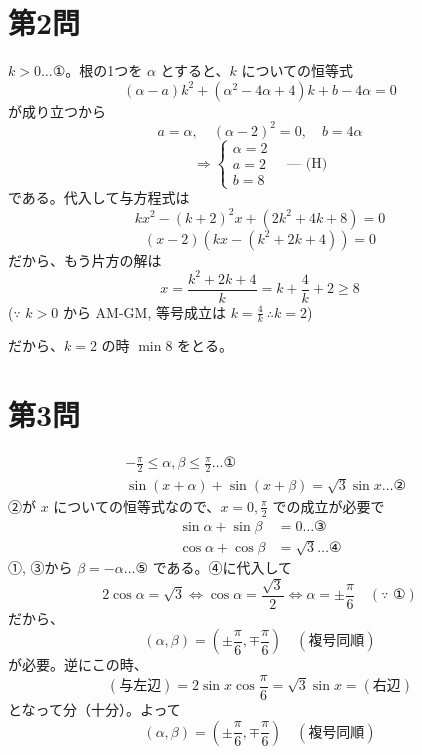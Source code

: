 \documentclass[../main.tex]{subfiles}
\begin{document}
\section*{第2問}

\noindent
[\textbf{解}] $k > 0 \dots \text{①}$。根の1つを $\alpha$ とすると、$k$ についての恒等式
\[
  (\alpha - a)k^2 + (\alpha^2 - 4\alpha + 4)k + b - 4\alpha = 0
\]
が成り立つから
\[
  a = \alpha, \quad (\alpha - 2)^2 = 0, \quad b = 4\alpha
\]
\[
  \Rightarrow
  \begin{cases} \alpha = 2 \\ a = 2 \\ b = 8
  \end{cases} \quad \text{--- (H)}
\]
である。代入して与方程式は
\[
  k x^2 - (k+2)^2 x + (2k^2 + 4k + 8) = 0
\]
\[
  (x - 2)\left(k x - (k^2 + 2k + 4)\right) = 0
\]
だから、もう片方の解は
\[
  x = \frac{k^2 + 2k + 4}{k} = k + \frac{4}{k} + 2 \ge 8
\]
($\text{∵ } k > 0$ から AM-GM, 等号成立は $k = \frac{4}{k} \ \therefore k = 2$)

\noindent
だから、$k = 2$ の時 $\min 8$ をとる。

\newpage

\section*{第3問}

\noindent
[\textbf{解}]
\begin{align}
  &-\frac{\pi}{2} \le \alpha, \beta \le \frac{\pi}{2} \dots \text{①} \\
  &\sin(x+\alpha) + \sin(x+\beta) = \sqrt{3}\sin x \dots \text{②}
\end{align}
②が $x$ についての恒等式なので、$x = 0, \frac{\pi}{2}$ での成立が必要で
\begin{align}
  \sin\alpha + \sin\beta &= 0 \dots \text{③} \\
  \cos\alpha + \cos\beta &= \sqrt{3} \dots \text{④}
\end{align}
①, ③から $\beta = -\alpha \dots \text{⑤}$ である。④に代入して
\[
  2\cos\alpha = \sqrt{3} \iff \cos\alpha = \frac{\sqrt{3}}{2} \iff \alpha = \pm\frac{\pi}{6} \quad (\text{∵ } \text{①})
\]
だから、
\[
  (\alpha, \beta) = \left( \pm\frac{\pi}{6}, \mp\frac{\pi}{6} \right) \quad (\text{複号同順})
\]
が必要。逆にこの時、
\[
  (\text{与左辺}) = 2\sin x \cos\frac{\pi}{6} = \sqrt{3}\sin x = (\text{右辺})
\]
となって分（十分）。よって
\[
  (\alpha, \beta) = \left( \pm\frac{\pi}{6}, \mp\frac{\pi}{6} \right) \quad (\text{複号同順})
\]
\end{document}
